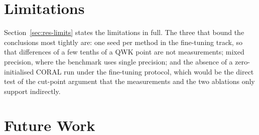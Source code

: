 \section{Limitations}

Section~\ref{sec:res-limits} states the limitations in full. The three that bound the
conclusions most tightly are: one seed per method in the fine-tuning track, so that differences
of a few tenths of a QWK point are not measurements; mixed precision, where the benchmark uses
single precision; and the absence of a zero-initialised CORAL run under the fine-tuning
protocol, which would be the direct test of the cut-point argument that the measurements and
the two ablations only support indirectly.

\section{Future Work}

